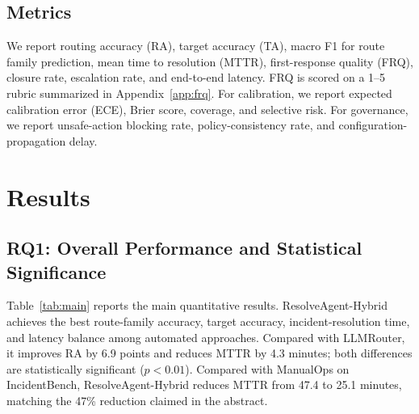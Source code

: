 \documentclass[conference]{IEEEtran}
\begin{document}
\subsection{Metrics}
We report routing accuracy (RA), target accuracy (TA), macro F1 for route family prediction, mean time to resolution (MTTR), first-response quality (FRQ), closure rate, escalation rate, and end-to-end latency. FRQ is scored on a 1--5 rubric summarized in Appendix~\ref{app:frq}. For calibration, we report expected calibration error (ECE), Brier score, coverage, and selective risk. For governance, we report unsafe-action blocking rate, policy-consistency rate, and configuration-propagation delay.

\section{Results}
\subsection{RQ1: Overall Performance and Statistical Significance}
Table~\ref{tab:main} reports the main quantitative results. ResolveAgent-Hybrid achieves the best route-family accuracy, target accuracy, incident-resolution time, and latency balance among automated approaches. Compared with LLMRouter, it improves RA by 6.9 points and reduces MTTR by 4.3 minutes; both differences are statistically significant ($p<0.01$). Compared with ManualOps on IncidentBench, ResolveAgent-Hybrid reduces MTTR from 47.4 to 25.1 minutes, matching the 47\% reduction claimed in the abstract.

\begin{table}[t]
\centering
\caption{Main results across routing and incident-resolution metrics. Values after $\pm$ denote 95\% bootstrap confidence intervals.}
\label{tab:main}
\end{table}
\end{document}
